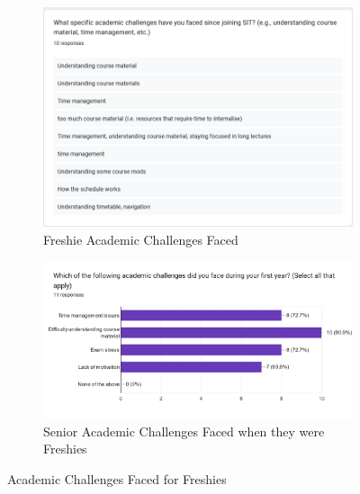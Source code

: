 \begin{figure}[H]
  \begin{subfigure}[b]{0.5\textwidth}
    \includegraphics[width=\textwidth]{Figures/Survey/freshie_3.png}
       \caption{\footnotesize Freshie Academic Challenges Faced}
       \label{freshie_acacdemic_difficulty}
  \end{subfigure}
  \hfill
  \begin{subfigure}[b]{0.5\textwidth}
    \includegraphics[width=\textwidth]{Figures/Survey/senior_3.png}
       \caption{\footnotesize Senior Academic Challenges Faced when they were Freshies}
       \label{senior_acacdemic_difficulty}
  \end{subfigure}
  \caption{Academic Challenges Faced for Freshies}
\end{figure}




